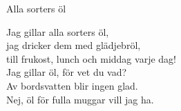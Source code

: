 \begin{song}{Alla sorters öl}
	
	
	
		
	Jag gillar alla sorters öl,\\
	jag dricker dem med glädjebröl,\\
	till frukost, lunch och middag varje dag!\\
	Jag gillar öl, för vet du vad?\\
	Av bordsvatten blir ingen glad.\\
	Nej, öl för fulla muggar vill jag ha.

	
\end{song}
